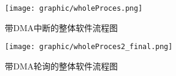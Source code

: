 \begin{figure}[!hbp]
\begin{center}
\texttt{[image: graphic/wholeProces.png]}
\caption{带DMA中断的整体软件流程图 \label{DMAIntWhole}}
\end{center}
\end{figure}

\begin{figure}[!hbp]
\begin{center}
\texttt{[image: graphic/wholeProces2\_final.png]}
\caption{带DMA轮询的整体软件流程图 \label{DMAaskWhole}}
\end{center}
\end{figure}



